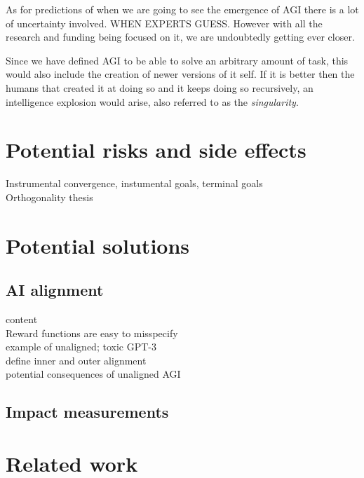 \documentclass{report}
\theoremstyle{definition}
\begin{document}
As for predictions of when we are going to see the emergence of AGI there is a lot of uncertainty involved. WHEN EXPERTS GUESS. However with all the research and funding being focused on it, we are undoubtedly getting ever closer.

Since we have defined AGI to be able to solve an arbitrary amount of task, this would also include the creation of newer versions of it self. If it is better then the humans that created it at doing so and it keeps doing so recursively, an intelligence explosion would arise, also referred to as the \textit{singularity}.

\section{Potential risks and side effects}

Instrumental convergence, instumental goals, terminal goals\\

Orthogonality thesis\\

\section{Potential solutions}

\subsection{AI alignment}
content\\ 

Reward functions are easy to misspecify\\

example of unaligned; toxic GPT-3\\

define inner and outer alignment\\

potential consequences of unaligned AGI\\

\subsection{Impact measurements}

\section{Related work}
\end{document}

